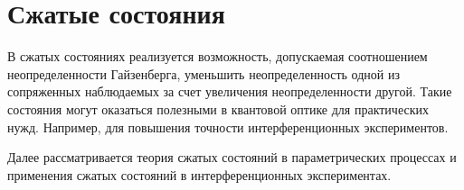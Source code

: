 \chapter{Сжатые состояния}
\label{chSqueezed}
В сжатых состояниях реализуется возможность, допускаемая соотношением
неопределенности Гайзенберга, уменьшить неопределенность одной из
сопряженных наблюдаемых за счет увеличения неопределенности другой.
Такие состояния могут оказаться полезными в квантовой оптике для
практических нужд. Например, для повышения точности интерференционных
экспериментов. 

Далее рассматривается теория сжатых состояний в параметрических
процессах и применения сжатых состояний в интерференционных
экспериментах. 











